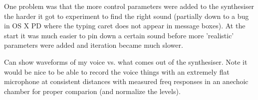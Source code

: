One problem was that the more control parameters were added to the synthesiser the harder it got to experiment to find the right sound (partially down to a bug in OS X PD where the typing caret does not appear in message boxes). At the start it was much easier to pin down a certain sound before more 'realistic' parameters were added and iteration became much slower.

Can show waveforms of my voice vs. what comes out of the synthesiser. Note it would be nice to be able to record the voice things with an extremely flat microphone at consistent distances with measured freq responses in an anechoic chamber for proper comparion (and normalize the levels).
